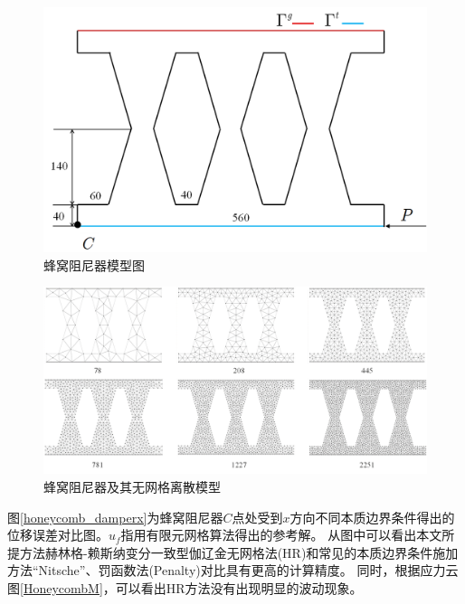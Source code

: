\begin{figure}[H]
    \centering
    \includegraphics[scale=0.5]{figure/DAMPER/Honeycomb/2.png}
    \caption{蜂窝阻尼器模型图}\label{Honeycomb2}
\end{figure}
\begin{figure}[H]
    \centering
    \includegraphics[scale=0.6]{figure/DAMPER/Honeycomb/honeycomb_damper_msh.png}
    \caption{蜂窝阻尼器及其无网格离散模型}\label{Honeycombmsh}
\end{figure}
图\ref{honeycomb_damperx}为蜂窝阻尼器$C$点处受到$x$方向不同本质边界条件得出的位移误差对比图。$u_f$指用有限元网格算法得出的参考解。
从图中可以看出本文所提方法赫林格-赖斯纳变分一致型伽辽金无网格法(HR)和常见的本质边界条件施加方法“Nitsche”、罚函数法(Penalty)对比具有更高的计算精度。
同时，根据应力云图\ref{HoneycombM}，可以看出HR方法没有出现明显的波动现象。
